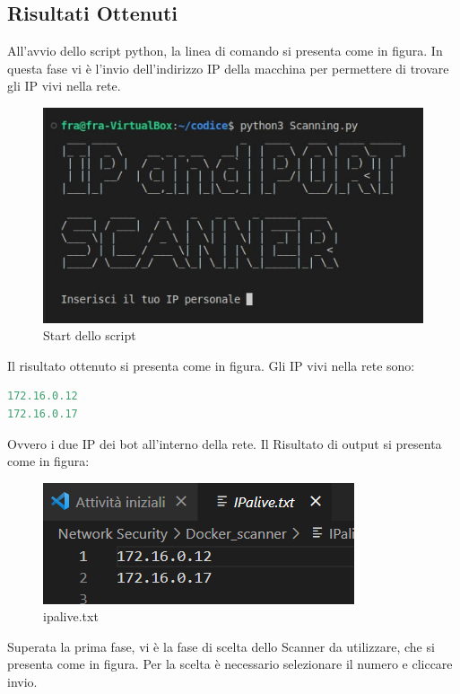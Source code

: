 \subsection{Risultati Ottenuti}
All'avvio dello script python, la linea di comando si presenta come in figura. In questa fase vi è l'invio dell'indirizzo IP della macchina per permettere di trovare gli IP vivi nella rete.

\begin{figure}[H]
    \centering
    \includegraphics[scale=0.5]{UNINA_MSc_Thesis_Project/img/Esecuzione/Scanning_start.jpg}
    \caption{Start dello script}
    \label{fig:my_label}
\end{figure}

Il risultato ottenuto si presenta come in figura. Gli IP vivi nella rete sono:

\begin{lstlisting}[language=Python]
172.16.0.12
172.16.0.17
\end{lstlisting}

Ovvero i due IP dei bot all'interno della rete. Il Risultato di output si presenta come in figura: 

\begin{figure}[H]
    \centering
    \includegraphics[scale=0.8]{UNINA_MSc_Thesis_Project/img/Esecuzione/ipalive.png}
    \caption{ipalive.txt}
    \label{fig:my_label}
\end{figure}

Superata la prima fase, vi è la fase di scelta dello Scanner da utilizzare, che si presenta come in figura. Per la scelta è necessario selezionare il numero e cliccare invio.

